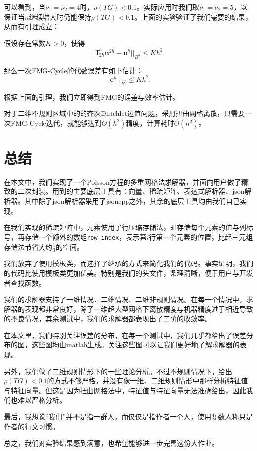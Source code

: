 \documentclass[lang=cn,10pt]{elegantbook}
\begin{document}
可以看到，当$\nu_1=\nu_2=4$时，$\rho(TG)<0.1$。实际应用时我们取$\nu_1=\nu_2=5$，以保证当$n$继续增大时仍能保持$\rho(TG)<0.1$。上面的实验验证了我们需要的结果，从而有引理成立：

\begin{lemma}
  假设存在常数$K>0$，使得
  \begin{equation}
    ||\mathbf{I}_{2h}^h \mathbf{u}^{2h}-\mathbf{u}^{h}||_{B^h}\leq Kh^2.
  \end{equation}

  那么一次FMG-Cycle的代数误差有如下估计：
  \begin{equation}
    ||\mathbf{e}^h||_{B^h}\leq Kh^2.
  \end{equation}
\end{lemma}

根据上面的引理，我们立即得到FMG的误差与效率估计。

\begin{theorem}
  对于二维不规则区域中的的齐次Dirichlet边值问题，采用扭曲网格离散，只需要一次FMG-Cycle迭代，就能够达到$O(h^2)$精度，计算耗时$O(n^2)$。
\end{theorem}

\vspace{5em}

\chapter{总结}

在本文中，我们实现了一个Poisson方程的多重网格法求解器，并面向用户做了精致的二次封装。用到的主要底层工具有：向量、稀疏矩阵、表达式解析器、json解析器。其中除了json解析器采用了jsoncpp之外，其余的底层工具均由我们自己实现。

在我们实现的稀疏矩阵中，元素使用了行压缩存储法，即存储每个元素的值与列标号，再存储一个额外的数组\verb|row_index|，表示第$i$行第一个元素的位置。比起三元组存储法节省大约$\frac{1}{3}$的空间。

我们放弃了使用模板类，而选择了继承的方式来简化我们的代码。事实证明，我们的代码比使用模板类更加优美。特别是我们的头文件，条理清晰，便于用户与开发者查找函数。

我们的求解器支持了一维情况、二维情况、二维非规则情况。在每一个情况中，求解器的表现都非常良好，除了一维超大型网格下离散精度与机器精度过于相近导致的不良情况，其余测试中，我们的求解器都表现出了二阶的收敛率。

在本文里，我们特别关注误差的分布，在每一个测试中，我们几乎都给出了误差分布的图，这些图均由matlab生成。关注这些图可以让我们更好地了解求解器的表现。

另外，我们做了二维规则情形下的一些理论分析。不过不规则情况下，给出$\rho(TG)<0.1$的方式不够严格，并没有像一维、二维规则情形中那样分析特征值与特征向量。但这是因为扭曲网格法中，特征值与特征向量无法准确给出，因此我们也难以严格分析。

最后，我想说“我们”并不是指一群人，而仅仅是指作者一个人，使用复数人称只是作者的行文习惯。

总之，我们对实验结果感到满意，也希望能够进一步完善这份大作业。
\end{document}
